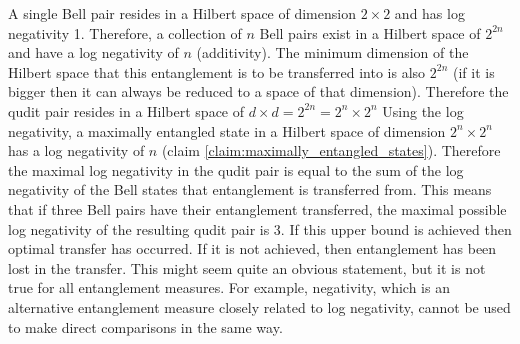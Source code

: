 A single Bell pair resides in a Hilbert space of dimension $2 \times 2$ and has log negativity 1.
Therefore, a collection of $n$ Bell pairs exist in a Hilbert space of $2^{2n}$ and have a log negativity of $n$ (additivity).
The minimum dimension of the Hilbert space that this entanglement is to be transferred into is also $2^{2n}$ (if it is bigger then it can always be reduced to a space of that dimension).
Therefore the qudit pair resides in a Hilbert space of $d\times d = 2^{2n} = 2^n \times 2^n$
Using the log negativity, a maximally entangled state in a Hilbert space of dimension $2^n \times 2^n$ has a log negativity of $n$ (claim \ref{claim:maximally_entangled_states}).
Therefore the maximal log negativity in the qudit pair is equal to the sum of the log negativity of the Bell states that entanglement is transferred from.
This means that if three Bell pairs have their entanglement transferred, the maximal possible log negativity of the resulting qudit pair is 3.
If this upper bound is achieved then optimal transfer has occurred.
If it is not achieved, then entanglement has been lost in the transfer.
This might seem quite an obvious statement, but it is not true for all entanglement measures.
For example, negativity, which is an alternative entanglement measure closely related to log negativity, cannot be used to make direct comparisons in the same way.